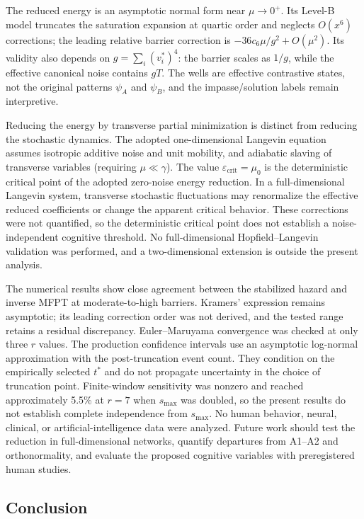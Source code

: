 \documentclass[a4paper,twocolumn,10pt]{article}
\newcommand{\eps}{\varepsilon}
\newcommand{\psiA}{\psi_A}
\newcommand{\psiB}{\psi_B}
\begin{document}
The reduced energy is an asymptotic normal form near $\mu\to0^+$. Its Level-B model truncates the
saturation expansion at quartic order and neglects $O(x^6)$ corrections; the leading relative
barrier correction is $-36c_6\mu/g^2+O(\mu^2)$. Its validity also depends on
$g=\sum_i(v_i^*)^4$: the barrier scales as $1/g$, while the effective canonical noise contains
$gT$. The wells are effective contrastive states, not the original patterns $\psiA$ and $\psiB$,
and the impasse/solution labels remain interpretive.

Reducing the energy by transverse partial minimization is distinct from reducing the stochastic
dynamics. The adopted one-dimensional Langevin equation assumes isotropic additive noise and unit
mobility, and adiabatic slaving of transverse variables (requiring $\mu\ll\gamma$).
The value $\eps_{\mathrm{crit}}=\mu_0$ is the deterministic critical point of the adopted
zero-noise energy reduction. In a full-dimensional Langevin system, transverse stochastic
fluctuations may renormalize the effective reduced coefficients or change the apparent critical
behavior. These corrections were not quantified, so the deterministic critical point does not
establish a noise-independent cognitive threshold.
No full-dimensional Hopfield--Langevin validation was performed,
and a two-dimensional extension is outside the present analysis.

The numerical results show close agreement between the stabilized hazard and inverse MFPT at
moderate-to-high barriers. Kramers'
expression remains asymptotic; its leading correction order was not derived, and the tested range
retains a residual discrepancy. Euler--Maruyama convergence was checked at only three $r$ values.
The production confidence intervals use an asymptotic log-normal approximation with the
post-truncation event count. They condition on the empirically selected $t^*$ and do not
propagate uncertainty in the choice of truncation point. Finite-window sensitivity was nonzero and reached approximately 5.5\%
at $r=7$ when $s_{\max}$ was doubled, so the present results do not establish complete independence
from $s_{\max}$. No human behavior, neural, clinical, or artificial-intelligence data were analyzed.
Future work should test the reduction in full-dimensional networks, quantify
departures from A1--A2 and orthonormality, and evaluate the proposed cognitive variables with
preregistered human studies.

\subsection{Conclusion}
\end{document}
